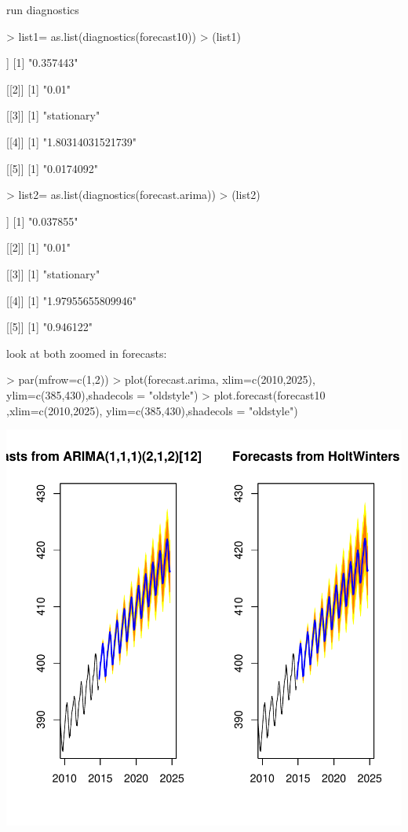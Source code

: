 \documentclass[11pt, a4paper]{article} %
\begin{document}
run diagnostics
\begin{Schunk}
\begin{Sinput}
> list1= as.list(diagnostics(forecast10))
> (list1)
\end{Sinput}
\begin{Soutput}
[[1]]
[1] "0.357443"

[[2]]
[1] "0.01"

[[3]]
[1] "stationary"

[[4]]
[1] "1.80314031521739"

[[5]]
[1] "0.0174092"
\end{Soutput}
\begin{Sinput}
> list2= as.list(diagnostics(forecast.arima))
> (list2)
\end{Sinput}
\begin{Soutput}
[[1]]
[1] "0.037855"

[[2]]
[1] "0.01"

[[3]]
[1] "stationary"

[[4]]
[1] "1.97955655809946"

[[5]]
[1] "0.946122"
\end{Soutput}
\end{Schunk}
\linebreak
look at both zoomed in forecasts:
\begin{Schunk}
\begin{Sinput}
> par(mfrow=c(1,2))
> plot(forecast.arima, xlim=c(2010,2025), ylim=c(385,430),shadecols = "oldstyle")
> plot.forecast(forecast10 ,xlim=c(2010,2025), ylim=c(385,430),shadecols = "oldstyle")
\end{Sinput}
\end{Schunk}
\includegraphics{alleselena-064}
\end{document}
